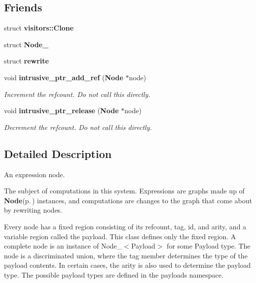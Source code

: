\subsection*{Friends}
\begin{CompactItemize}
\item 
struct {\bf visitors::Clone}\label{structsprite_1_1Node_n0}

\item 
struct {\bf Node\_\-}\label{structsprite_1_1Node_n1}

\item 
struct {\bf rewrite}\label{structsprite_1_1Node_n2}

\item 
void {\bf intrusive\_\-ptr\_\-add\_\-ref} ({\bf Node} $\ast$node)\label{structsprite_1_1Node_n3}

\begin{CompactList}\small\item\em Increment the refcount. Do not call this directly. \item\end{CompactList}\item 
void {\bf intrusive\_\-ptr\_\-release} ({\bf Node} $\ast$node)\label{structsprite_1_1Node_n4}

\begin{CompactList}\small\item\em Decrement the refcount. Do not call this directly. \item\end{CompactList}\end{CompactItemize}


\subsection{Detailed Description}
An expression node. 

The subject of computations in this system. Expressions are graphs made up of {\bf Node}{\rm (p.\,\pageref{structsprite_1_1Node})} instances, and computations are changes to the graph that come about by rewriting nodes.

Every node has a fixed region consisting of its refcount, tag, id, and arity, and a variable region called the payload. This class defines only the fixed region. A complete node is an instance of Node\_\-$<$Payload$>$ for some Payload type. The node is a discriminated union, where the tag member determines the type of the payload contents. In certain cases, the arity is also used to determine the payload type. The possible payload types are defined in the payloads namespace.

